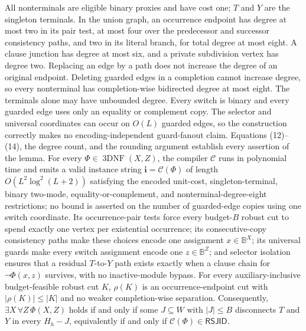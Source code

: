 All nonterminals are eligible binary proxies and have cost one; \(T\) and \(Y\) are the singleton terminals.  In the union graph, an occurrence endpoint has degree at most two in its pair test, at most four over the predecessor and successor consistency paths, and two in its literal branch, for total degree at most eight.  A clause junction has degree at most six, and a private subdivision vertex has degree two.  Replacing an edge by a path does not increase the degree of an original endpoint.  Deleting guarded edges in a completion cannot increase degree, so every nonterminal has completion-wise bidirected degree at most eight.  The terminals alone may have unbounded degree.  Every switch is binary and every guarded edge uses only an equality or complement copy.  The selector and universal coordinates can occur on \(O(L)\) guarded edges, so the construction correctly makes no encoding-independent guard-fanout claim.  Equations (12)--(14), the degree count, and the rounding argument establish every assertion of the lemma.
For every \(\Phi\in\operatorname{3DNF}(X,Z)\), the compiler \(\mathcal C\) runs in polynomial time and emits a valid instance string \(\mathbf i=\mathcal C(\Phi)\) of length \(O(L^2\log^2(L+2))\) satisfying the encoded unit-cost, singleton-terminal, binary two-mode, equality-or-complement, and nonterminal-degree-eight restrictions; no bound is asserted on the number of guarded-edge copies using one switch coordinate. Its occurrence-pair tests force every budget-\(B\) robust cut to spend exactly one vertex per existential occurrence; its consecutive-copy consistency paths make these choices encode one assignment \(x\in\mathbb B^X\); its universal guards make every switch assignment encode one \(z\in\mathbb B^Z\); and selector isolation ensures that a residual \(T\)-to-\(Y\) path exists exactly when a clause chain for \(\neg\Phi(x,z)\) survives, with no inactive-module bypass. For every auxiliary-inclusive budget-feasible robust cut \(K\), \(\rho(K)\) is an occurrence-endpoint cut with \(|\rho(K)|\le |K|\) and no weaker completion-wise separation. Consequently, \(\exists X\,\forall Z\,\Phi(X,Z)\) holds if and only if some \(J\subseteq W\) with \(|J|\le B\) disconnects \(T\) and \(Y\) in every \(H_h-J\), equivalently if and only if \(\mathcal C(\Phi)\in\mathsf{RSJID}\).
